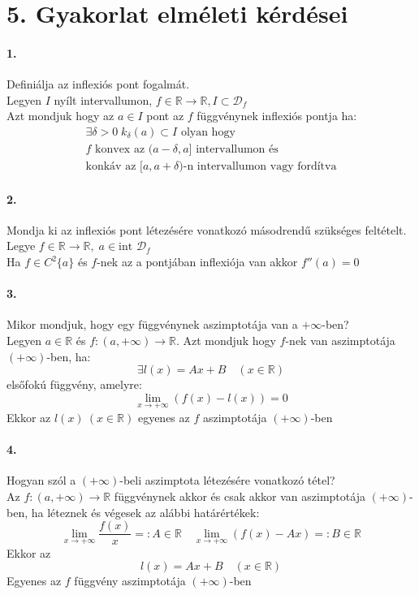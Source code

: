 \documentclass[10pt,a4paper]{article}
\newcommand{\R}{\mathbb{R}}
\newcommand{\D}{\mathcal{D}}
\newcommand{\fR}{f\in\R\rightarrow\R}
\newcommand{\pf}{+\infty}
\renewcommand{\>}{\rightarrow}
\begin{document}
\section{5. Gyakorlat elméleti kérdései}
\paragraph{1.}
Definiálja az inflexiós pont fogalmát. \\
Legyen $I$ nyílt intervallumon, $\fR, I \subset \D_f$ \\
Azt mondjuk hogy az $a\in I$ pont az $f$ függvénynek inflexiós pontja ha:
\begin{gather*}
\exists \delta > 0 \; k_\delta (a) \subset I \text{ olyan hogy} \\
f \text{ konvex az } (a-\delta , a] \text{ intervallumon és }\\ \text{konkáv az } [a,a+\delta)\text{-n intervallumon vagy fordítva}  
\end{gather*} 
\paragraph{2.}
Mondja ki az inflexiós pont létezésére vonatkozó másodrendű szükséges feltételt. \\
Legye $\fR, \; a \in \text{int } \D_f$ \\
Ha $f\in C^2\{a\}$ és $f$-nek az a pontjában inflexiója van akkor $f''(a)=0$
\paragraph{3.}
Mikor mondjuk, hogy egy függvénynek aszimptotája van a $+\infty$-ben? \\
Legyen $a\in \R $ és $f : (a,\pf) \rightarrow \R.$ Azt mondjuk hogy $f$-nek van aszimptotája $(\pf)$-ben, ha:
\[
\exists l(x)=Ax+B \quad (x\in\R)
\]
elsőfokú függvény, amelyre:
\[
\lim\limits_{x\rightarrow\pf}(f(x)-l(x)) = 0
\] 
Ekkor az $l(x) \: (x\in\R)$ egyenes az $f$ aszimptotája $(\pf)$-ben
\paragraph{4.}
Hogyan szól a $(\pf)$-beli aszimptota létezésére vonatkozó tétel?\\
Az $f:(a,\pf)\rightarrow\R$ függvénynek akkor és csak akkor van aszimptotája $(\pf)$-ben, ha léteznek és végesek az alábbi határértékek:
\[
\lim\limits_{x\rightarrow\pf} \frac{f(x)}{x} =: A \in \R \quad \lim\limits_{x\rightarrow\pf} (f(x)-Ax) =: B \in \R
\]
Ekkor az
\[
l(x)=Ax+B \quad (x\in\R)
\]
Egyenes az $f$ függvény aszimptotája $(\pf)$-ben
\end{document}
